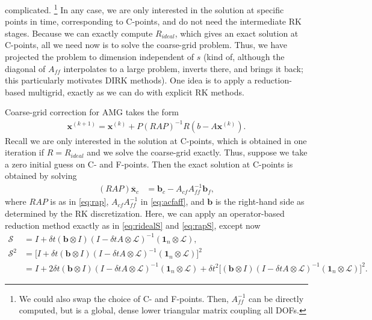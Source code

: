 \documentclass[a4paper,12pt]{article}
\begin{document}
complicated. \footnote{
We could also swap the choice of C- and F-points. Then, $A_{ff}^{-1}$ can be directly computed, but is a global, dense lower triangular
matrix coupling all DOFs.} In any case, we are only interested in the solution at specific points in time, corresponding to C-points, and
do not need the intermediate RK stages. Because we can exactly compute $R_{ideal}$, which gives an exact solution at C-points, all we
need now is to solve the coarse-grid problem. Thus, we have projected the problem to dimension independent of $s$ (kind of, although
the diagonal of $A_{ff}$ interpolates to a large problem, inverts there, and brings it back; this particularly motivates DIRK methods). 
One idea is to apply a reduction-based multigrid, exactly as we can do with explicit RK methods.

Coarse-grid correction for AMG takes the form
%
\begin{align*}
\mathbf{x}^{(k+1)} = \mathbf{x}^{(k)} + P(RAP)^{-1}R(b - A\mathbf{x}^{(k)}).
\end{align*}
%
Recall we are only interested in the solution at C-points, which is obtained in one iteration if $R = R_{ideal}$ and we
solve the coarse-grid exactly. Thus, suppose we take a zero initial guess on C- and F-points. Then the exact solution
at C-points is obtained by solving
%
\begin{align*}
(RAP)\overline{\mathbf{x}}_c & = \mathbf{b}_c - A_{cf}A_{ff}^{-1}\mathbf{b}_f,
\end{align*}
%
where $RAP$ is as in \eqref{eq:rap}, $A_{cf}A_{ff}^{-1}$ in \eqref{eq:acfaff}, and $\mathbf{b}$ is the right-hand side
as determined by the RK discretization. Here, we can apply an operator-based reduction method exactly as in \eqref{eq:ridealS}
and \eqref{eq:rapS}, except now 
%
{\small
\begin{align}
\mathcal{S} & = I + \delta t(\mathbf{b}\otimes I )(I - \delta tA\otimes \mathcal{L})^{-1}(\mathbf{1}_n \otimes \mathcal{L}), \nonumber\\
\mathcal{S}^2 & = \Big[ I + \delta t(\mathbf{b}\otimes I )(I - \delta tA\otimes \mathcal{L})^{-1}(\mathbf{1}_n \otimes \mathcal{L}) \Big]^2 \nonumber\\
	 & = I + 2\delta t (\mathbf{b}\otimes I )(I - \delta tA\otimes \mathcal{L})^{-1}(\mathbf{1}_n \otimes \mathcal{L}) + \delta t^2\Big[(\mathbf{b}\otimes I )(I - \delta tA\otimes \mathcal{L})^{-1}(\mathbf{1}_n \otimes \mathcal{L}) \Big]^2. \label{eq:s2_rk}
\end{align}
}
%
\end{document}
